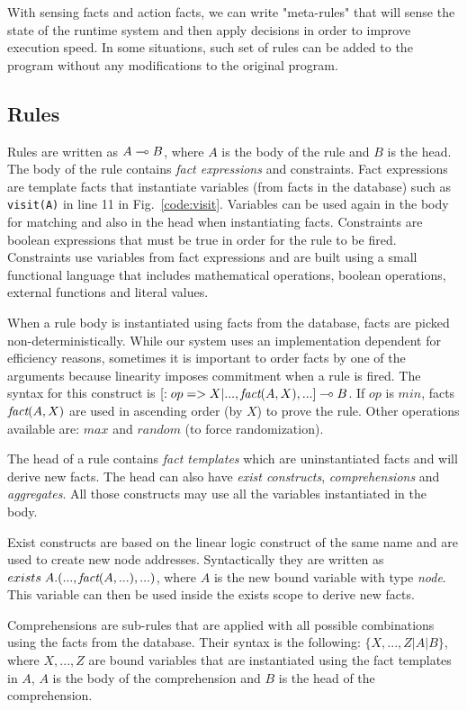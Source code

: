 With sensing facts and action facts, we can write "meta-rules" that will sense the state of the runtime system
and then apply decisions in order to improve execution speed. In some situations, such set of rules can be
added to the program without any modifications to the original program.

\subsection{Rules}

Rules are written as $A \multimap B$, where $A$ is the body of the rule and $B$ is the head.
The body of the rule contains \emph{fact expressions} and constraints.
Fact expressions are template facts that instantiate variables (from facts in the database)
such as \texttt{visit(A)} in line 11 in Fig.~\ref{code:visit}. Variables can be used again in the body for matching and
also in the head when instantiating facts. Constraints are boolean expressions that must
be true in order for the rule to be fired. Constraints use variables from fact expressions and are built using a small functional language that includes mathematical operations, boolean operations, external functions and literal values.

When a rule body is instantiated using facts from the database, facts are picked non-deterministically.
While our system uses an implementation dependent for efficiency reasons,
sometimes it is important to order facts by one of the arguments because linearity imposes commitment when a rule is fired. The syntax for this construct is $[:op => X | ..., \emph{fact}(A, X), ...] \multimap B$. If $op$ is $min$, facts $\emph{fact}(A, X)$ are used in ascending order (by $X$) to prove the rule. Other operations available are: $max$ and $random$ (to force randomization).

The head of a rule contains \emph{fact templates} which are uninstantiated facts and will derive new facts. The head can also have \emph{exist constructs}, \emph{comprehensions} and \emph{aggregates}. All those constructs may use all the variables instantiated in the body.

Exist constructs are based on the linear logic construct of the same name and are used to create new node addresses. Syntactically they are written as $exists \; A. (..., \emph{fact}(A, ...), ...)$, where $A$ is the new bound variable with type \emph{node}. This variable can then be used inside the exists scope to derive new facts.

Comprehensions are sub-rules that are applied with all possible combinations using the facts from the database. Their syntax is the following: $\{X, ..., Z | A | B\}$, where $X, ..., Z$ are bound variables that are instantiated using the fact templates in $A$, $A$ is the body of the comprehension and $B$ is the head of the comprehension.

